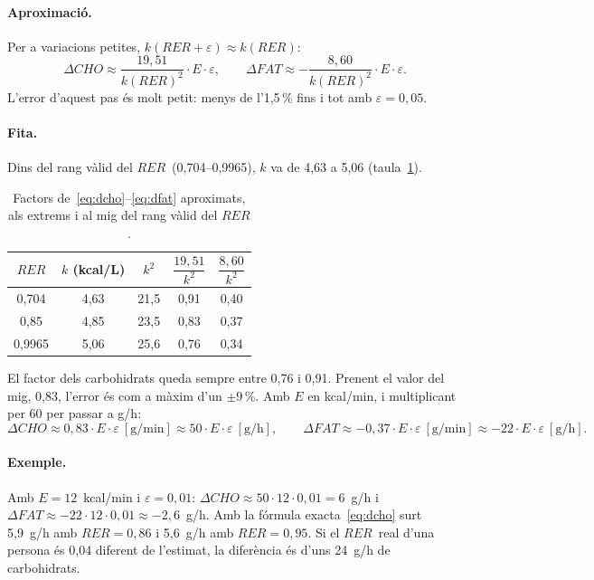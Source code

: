 \documentclass[10pt,a4paper]{article}
\newcommand{\cho}{\ensuremath{\mathit{CHO}}}               %
\newcommand{\fat}{\ensuremath{\mathit{FAT}}}
\newcommand{\RER}{\ensuremath{\mathit{RER}}}
\begin{document}
\paragraph{Aproximació.} Per a variacions petites, $k(\RER+\varepsilon)\approx k(\RER)$:
\[
  \Delta\cho\approx\frac{19{,}51}{k(\RER)^2}\cdot E\cdot\varepsilon,\qquad
  \Delta\fat\approx-\frac{8{,}60}{k(\RER)^2}\cdot E\cdot\varepsilon .
\]
L'error d'aquest pas és molt petit: menys de l'1,5\,\% fins i tot amb $\varepsilon=0{,}05$.

\paragraph{Fita.} Dins del rang vàlid del \RER\ (0,704--0,9965), $k$ va de 4,63 a 5,06
(taula~\ref{tab:sens}).

\begin{table}[H]
\centering
\caption{Factors de~\eqref{eq:dcho}--\eqref{eq:dfat} aproximats, als extrems i al mig del
rang vàlid del \RER.}
\label{tab:sens}
\small
\begin{tabular}{@{}ccccc@{}}
\toprule
\RER & $k$ (kcal/L) & $k^2$ & $\dfrac{19{,}51}{k^2}$ & $\dfrac{8{,}60}{k^2}$ \\[6pt]
\midrule
0,704  & 4,63 & 21,5 & 0,91 & 0,40 \\
0,85   & 4,85 & 23,5 & 0,83 & 0,37 \\
0,9965 & 5,06 & 25,6 & 0,76 & 0,34 \\
\bottomrule
\end{tabular}
\end{table}

\noindent El factor dels carbohidrats queda sempre entre 0,76 i 0,91. Prenent el valor del
mig, 0,83, l'error és com a màxim d'un $\pm9$\,\%. Amb $E$ en kcal/min, i multiplicant per
60 per passar a g/h:
\begin{equation}
  \Delta\cho\approx0{,}83\cdot E\cdot\varepsilon~[\mathrm{g/min}]
  \approx50\cdot E\cdot\varepsilon~[\mathrm{g/h}],\qquad
  \Delta\fat\approx-0{,}37\cdot E\cdot\varepsilon~[\mathrm{g/min}]
  \approx-22\cdot E\cdot\varepsilon~[\mathrm{g/h}].
\label{eq:dsimple}
\end{equation}

\paragraph{Exemple.} Amb $E=12$~kcal/min i $\varepsilon=0{,}01$:
$\Delta\cho\approx50\cdot12\cdot0{,}01=6$~g/h i $\Delta\fat\approx-22\cdot12\cdot0{,}01
\approx-2{,}6$~g/h. Amb la fórmula exacta~\eqref{eq:dcho} surt 5,9~g/h amb $\RER=0{,}86$ i
5,6~g/h amb $\RER=0{,}95$. Si el \RER\ real d'una persona és 0,04 diferent de l'estimat, la
diferència és d'uns 24~g/h de carbohidrats.
\end{document}
